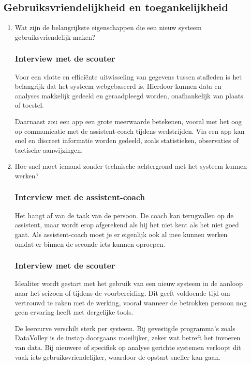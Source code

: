 \subsection{Gebruiksvriendelijkheid en toegankelijkheid}
\begin{enumerate}
  \item Wat zijn de belangrijkste eigenschappen die een nieuw systeem gebruiksvriendelijk maken?
  \subsubsection{Interview met de scouter}
  Voor een vlotte en efficiënte uitwisseling van gegevens tussen stafleden is het belangrijk dat het systeem webgebaseerd is. Hierdoor kunnen data en analyses makkelijk gedeeld en geraadpleegd worden, onafhankelijk van plaats of toestel.

  Daarnaast zou een app een grote meerwaarde betekenen, vooral met het oog op communicatie met de assistent-coach tijdens wedstrijden. Via een app kan snel en discreet informatie worden gedeeld, zoals statistieken, observaties of tactische aanwijzingen.
  \item Hoe snel moet iemand zonder technische achtergrond met het systeem kunnen werken?
  \subsubsection{Interview met de assistent-coach}
  Het hangt af van de taak van de persoon. De coach kan terugvallen op de assistent, maar wordt erop afgerekend als hij het niet kent als het niet goed gaat. Als assistent-coach moet je er eigenlijk ook al mee kunnen werken omdat er binnen de seconde iets kunnen oproepen.
  \subsubsection{Interview met de scouter}
  Idealiter wordt gestart met het gebruik van een nieuw systeem in de aanloop naar het seizoen of tijdens de voorbereiding. Dit geeft voldoende tijd om vertrouwd te raken met de werking, vooral wanneer de betrokken persoon nog geen ervaring heeft met dergelijke tools.

  De leercurve verschilt sterk per systeem. Bij gevestigde programma’s zoals DataVolley is de instap doorgaans moeilijker, zeker wat betreft het invoeren van data. Bij nieuwere of specifiek op analyse gerichte systemen verloopt dit vaak iets gebruiksvriendelijker, waardoor de opstart sneller kan gaan.


\end{enumerate}
